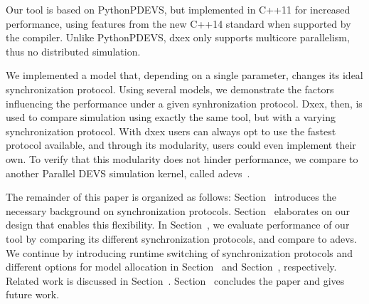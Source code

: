 Our tool is based on PythonPDEVS, but implemented in C++11 for increased performance, using features from the new C++14 standard when supported by the compiler.
Unlike PythonPDEVS, dxex only supports multicore parallelism, thus no distributed simulation.

We implemented a model that, depending on a single parameter, changes its ideal synchronization protocol.
Using several models, we demonstrate the factors influencing the performance under a given synhronization protocol.
Dxex, then, is used to compare simulation using exactly the same tool, but with a varying synchronization protocol.
With dxex users can always opt to use the fastest protocol available, and through its modularity, users could even implement their own.
To verify that this modularity does not hinder performance, we compare to another Parallel DEVS simulation kernel, called adevs~\cite{adevs}.

The remainder of this paper is organized as follows:
Section~\textsc{} introduces the necessary background on synchronization protocols.
Section~\textsc{} elaborates on our design that enables this flexibility.
In Section~\textsc{}, we evaluate performance of our tool by comparing its different synchronization protocols, and compare to adevs.
We continue by introducing runtime switching of synchronization protocols and different options for model allocation in Section~\textsc{} and Section~\textsc{}, respectively.
Related work is discussed in Section~\textsc{}.
Section~\textsc{} concludes the paper and gives future work.

